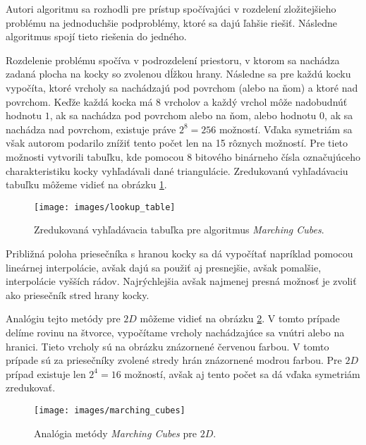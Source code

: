 Autori algoritmu sa rozhodli pre prístup spočívajúci v rozdelení zložitejšieho problému na 
jednoduchšie podproblémy, ktoré sa dajú ľahšie riešiť. Následne algoritmus 
spojí tieto riešenia do jedného.

Rozdelenie problému spočíva v podrozdelení priestoru, v ktorom sa nachádza zadaná plocha na kocky 
so zvolenou dĺžkou hrany. 
Následne sa pre každú kocku vypočíta, ktoré vrcholy sa nachádzajú pod povrchom (alebo na ňom) 
a ktoré nad povrchom. Keďže každá kocka má 8 vrcholov a každý vrchol môže nadobudnúť hodnotu $1$, ak sa 
nachádza pod povrchom alebo na ňom, alebo hodnotu $0$, ak sa nachádza nad povrchom, existuje práve 
$2^8 = 256$ možností. Vďaka symetriám sa však autorom podarilo znížiť tento počet len na 15 rôznych možností.
Pre tieto možnosti vytvorili tabuľku, kde pomocou 8 bitového binárneho čísla označujúceho charakteristiku
kocky vyhľadávali dané triangulácie. Zredukovanú vyhľadávaciu tabuľku môžeme vidieť na obrázku \ref{obr:lookup_table}.

\begin{figure}
    \centerline{\texttt{[image: images/lookup\_table]}}
    \caption[Zredukovaná vyhľadávacia tabuľka pre algoritmus Marching Cubes]
    {Zredukovaná vyhľadávacia tabuľka \cite{smistad2012real} pre algoritmus \textit{Marching Cubes}.}
    \label{obr:lookup_table}
\end{figure}

Približná poloha priesečníka s hranou kocky sa dá vypočítať napríklad pomocou lineárnej interpolácie, avšak 
dajú sa použiť aj presnejšie, avšak pomalšie, interpolácie vyšších rádov. Najrýchlejšia avšak najmenej presná
možnosť je zvoliť ako priesečník stred hrany kocky.

Analógiu tejto metódy pre $2D$ môžeme vidieť na obrázku \ref{obr:marching_cubes}. V tomto prípade delíme rovinu na štvorce, 
vypočítame vrcholy nachádzajúce sa vnútri alebo na hranici. Tieto vrcholy sú na obrázku znázornené 
červenou farbou. V tomto prípade sú za priesečníky zvolené stredy hrán znázornené modrou farbou. 
Pre $2D$ prípad existuje len $2^4 = 16$ možností, avšak aj tento počet sa dá vďaka symetriám zredukovať.


\begin{figure}
    \centerline{\texttt{[image: images/marching\_cubes]}}
    \caption[Analógia metódy Marching Cubes]{Analógia metódy \textit{Marching Cubes} pre $2D$.}
    \label{obr:marching_cubes}
\end{figure}

